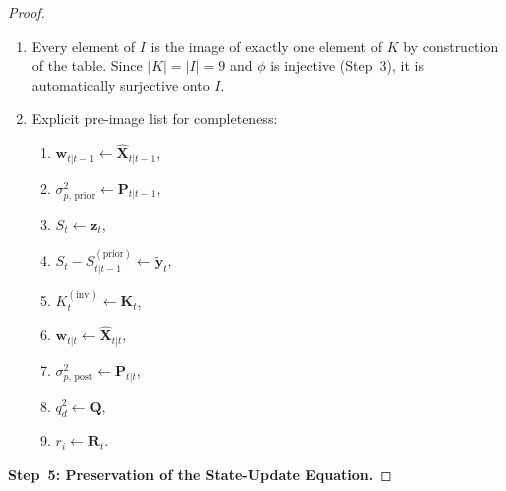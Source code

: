 \documentclass[12pt,openany]{book}
\numberwithin{equation}{chapter}
\theoremstyle{plain}
\theoremstyle{definition}
\theoremstyle{remark}
\def\mathcal#1{#1}%
\begin{document}
\begin{proof}
\begin{enumerate}
  \item Every element of $\mathcal{I}$ is the image of exactly
        one element of $\mathcal{K}$ by construction of the
        table.  Since $|\mathcal{K}| = |\mathcal{I}| = 9$ and
        $\phi$ is injective (Step~3), it is automatically
        surjective onto $\mathcal{I}$.
  \item Explicit pre-image list for completeness:
        \begin{enumerate}
          \item $\mathbf{w}_{t|t-1}
                \leftarrow \hat{\mathbf{X}}_{t|t-1}$,
          \item $\sigma_{p,\,\text{prior}}^2
                \leftarrow \mathbf{P}_{t|t-1}$,
          \item $S_t \leftarrow \mathbf{z}_t$,
          \item $S_t - S_{t|t-1}^{(\mathrm{prior})}
                \leftarrow \tilde{\mathbf{y}}_t$,
          \item $K_t^{(\mathrm{inv})}
                \leftarrow \mathbf{K}_t$,
          \item $\mathbf{w}_{t|t}
                \leftarrow \hat{\mathbf{X}}_{t|t}$,
          \item $\sigma_{p,\,\text{post}}^2
                \leftarrow \mathbf{P}_{t|t}$,
          \item $q_d^2 \leftarrow \mathbf{Q}$,
          \item $r_i \leftarrow \mathbf{R}_t$.
        \end{enumerate}
\end{enumerate}

\medskip
\noindent\textbf{Step~5: Preservation of the State-Update
Equation.}


\end{proof}
\end{document}
